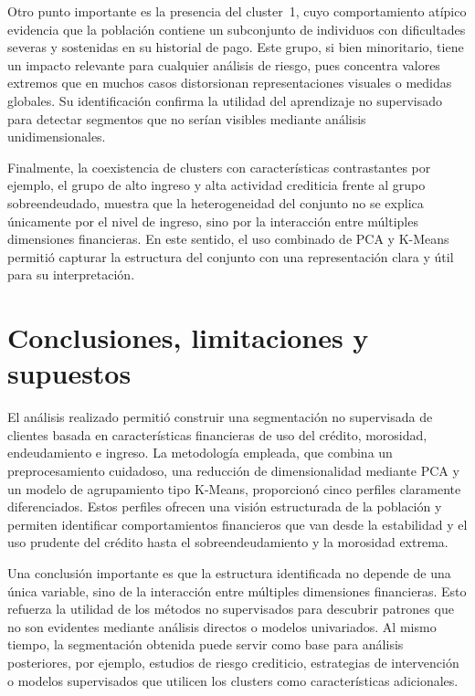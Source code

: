 \documentclass[a4paper,12pt]{article}
\begin{document}
Otro punto importante es la presencia del cluster~1, cuyo comportamiento atípico evidencia que la población 
contiene un subconjunto de individuos con dificultades severas y sostenidas en su historial de pago. Este grupo, 
si bien minoritario, tiene un impacto relevante para cualquier análisis de riesgo, pues concentra valores 
extremos que en muchos casos distorsionan representaciones visuales o medidas globales. Su identificación 
confirma la utilidad del aprendizaje no supervisado para detectar segmentos que no serían visibles mediante análisis 
unidimensionales.

Finalmente, la coexistencia de clusters con características contrastantes por ejemplo, el grupo de 
alto ingreso y alta actividad crediticia frente al grupo sobreendeudado, muestra que la heterogeneidad 
del conjunto no se explica únicamente por el nivel de ingreso, sino por la interacción entre múltiples 
dimensiones financieras. En este sentido, el uso combinado de PCA y K-Means permitió capturar la estructura 
del conjunto con una representación clara y útil para su interpretación.

\section{Conclusiones, limitaciones y supuestos}

El análisis realizado permitió construir una segmentación no supervisada de clientes basada en características 
financieras de uso del crédito, morosidad, endeudamiento e ingreso. La metodología empleada, que combina un 
preprocesamiento cuidadoso, una reducción de dimensionalidad mediante PCA y un modelo de agrupamiento tipo K-Means, 
proporcionó cinco perfiles claramente diferenciados. Estos perfiles ofrecen una visión estructurada de la población 
y permiten identificar comportamientos financieros que van desde la estabilidad y el uso prudente del crédito hasta 
el sobreendeudamiento y la morosidad extrema.

Una conclusión importante es que la estructura identificada no depende de una única variable, sino de la interacción 
entre múltiples dimensiones financieras. Esto refuerza la utilidad de los métodos no supervisados para descubrir 
patrones que no son evidentes mediante análisis directos o modelos univariados. Al mismo tiempo, la segmentación 
obtenida puede servir como base para análisis posteriores, por ejemplo, estudios de riesgo crediticio, estrategias de 
intervención o modelos supervisados que utilicen los clusters como características adicionales.
\end{document}
